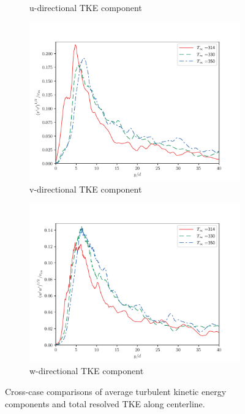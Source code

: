 \begin{figure}[H]
\begin{center}
\begin{subfigure}{0.45\textwidth}
	\caption{u-directional TKE component} \label{u_fa_1}
\end{subfigure}
\vfill
\begin{subfigure}{0.45\textwidth}
	\includegraphics[scale=.45]{figures/Plots/centerline/v_fa_centerline.pdf}
	\caption{v-directional TKE component} \label{v_fa_1}
\end{subfigure}
\begin{subfigure}{0.45\textwidth}
	\includegraphics[scale=.45]{figures/Plots/centerline/w_fa_centerline.pdf}
	\caption{w-directional TKE component} \label{w_fa_1}
\end{subfigure}
\caption{Cross-case comparisons of average turbulent kinetic energy components and total resolved TKE along centerline.}
\label{noniso_TKE_features}
\end{center}
\end{figure}








